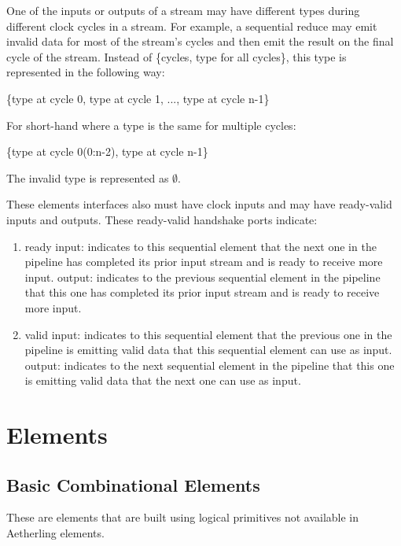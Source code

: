 \documentclass[11pt,fleqn]{article}
\numberwithin{equation}{subsection}
\begin{document}
One of the inputs or outputs of a stream may have different types during different
clock cycles in a stream. For example, a sequential reduce may emit invalid 
data for most of the stream's cycles and then emit the result on the final
cycle of the stream. Instead of \{cycles, type for all cycles\}, 
this type is represented in the following way:
\begin{adjustwidth}{2.5 em}{0 pt}
    \{type at cycle 0, type at cycle 1, ..., type at cycle n-1\}
\end{adjustwidth}
For short-hand where a type is the same for multiple cycles:
\begin{adjustwidth}{2.5 em}{0 pt}
    \{type at cycle 0(0:n-2), type at cycle n-1\}
\end{adjustwidth}
The invalid type is represented as $\emptyset$.

These elements interfaces also must have clock inputs and may have ready-valid 
inputs and outputs. These ready-valid handshake ports indicate:
\begin{enumerate}
        \item ready
            \subitem input: indicates to this sequential element that the next 
            one in the pipeline has completed its prior input stream and is 
            ready to receive more input.
            \subitem output: indicates to the previous sequential element in the 
            pipeline that this one has completed its prior input stream and is
            ready to receive more input.
        \item valid
            \subitem input: indicates to this sequential element that the previous
            one in the pipeline is emitting valid data that this sequential 
            element can use as input.
            \subitem output: indicates to the next sequential element in the
            pipeline that this one is emitting valid data that the next one
            can use as input.
\end{enumerate}

\section{Elements}

\subsection{Basic Combinational Elements}
These are elements that are built using logical primitives not available in
Aetherling elements.
\end{document}
